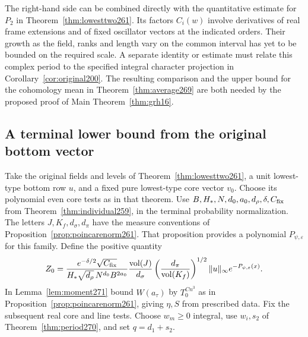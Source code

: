 \documentclass[a4paper,11pt]{article}
\theoremstyle{definition}
\theoremstyle{remark}
\numberwithin{equation}{section}
\begin{document}
The right-hand side can be combined directly with the
quantitative estimate for \(P_2\) in
Theorem~\ref{thm:lowesttwo261}. Its factors \(C_i(w)\)
involve derivatives of real frame extensions and of fixed
oscillator vectors at the indicated orders. Their growth
as the field, ranks and length vary on the common interval
has yet to be bounded on the required scale. A separate
identity or estimate must relate this complex period to
the specified integral character projection in
Corollary~\ref{cor:original200}. The resulting comparison
and the upper bound for the cohomology mean in
Theorem~\ref{thm:average269} are both needed by the proposed
proof of Main Theorem~\ref{thm:grh16}.

\subsection{A terminal lower bound from the original bottom vector}\label{nav:V-41}
Take the original fields and levels of
Theorem~\ref{thm:lowesttwo261}, a unit lowest-type bottom row
\(u\), and a fixed pure lowest-type core vector \(v_0\).
Choose its polynomial even core tests as in that theorem.
Use \(B,H_*,N,d_0,a_0,d_\rho,\delta,C_{\rm fix}\) from
Theorem~\ref{thm:individual259}, in the terminal probability
normalization. The letters \(J,K_f,d_\sigma,d_\pi\) have the
measure conventions of Proposition~\ref{prop:poincarenorm261}.
That proposition provides a polynomial \(P_{\psi,\varepsilon}\)
for this family. Define the positive quantity
\[
 Z_0=
 \frac{e^{-\delta/2}\sqrt{C_{\rm fix}}}
      {H_*\sqrt{d_\rho}\,N^{d_0} B^{2a_0}}
 \frac{\operatorname{vol}(J)}{d_\sigma}
 \left(\frac{d_\pi}{\operatorname{vol}(K_f)}\right)^{1/2}
 \|u\|_\infty e^{-P_{\psi,\varepsilon}(x)} .
\]
In Lemma~\ref{lem:moment271} bound \(W(a_\tau)\) by
\(T_0^{C n^3}\) as in Proposition~\ref{prop:poincarenorm261},
giving \(\eta,S\) from prescribed data. Fix the subsequent
real core and line tests. Choose \(w_m\ge0\) integral,
use \(w_i,s_2\) of Theorem~\ref{thm:period270}, and set
\(q=d_1+s_2\).
\end{document}
